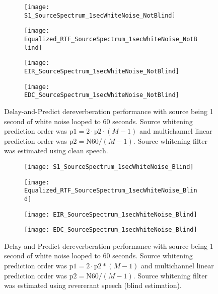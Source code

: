 \begin{figure}[H]
	\centering
	\begin{subfigure}[b]{0.49\textwidth}
		\centering
		\texttt{[image: S1\_SourceSpectrum\_1secWhiteNoise\_NotBlind]}
	\end{subfigure}
	\hfill
	\begin{subfigure}[b]{0.49\textwidth}
		\centering
		\texttt{[image: Equalized\_RTF\_SourceSpectrum\_1secWhiteNoise\_NotBlind]}
	\end{subfigure}
	\hfill
	\begin{subfigure}[b]{0.49\textwidth}
		\centering
		\texttt{[image: EIR\_SourceSpectrum\_1secWhiteNoise\_NotBlind]}
	\end{subfigure}
	\hfill
	\begin{subfigure}[b]{0.49\textwidth}
		\centering
		\texttt{[image: EDC\_SourceSpectrum\_1secWhiteNoise\_NotBlind]}
	\end{subfigure}
	\hfill
	\caption{Delay-and-Predict dereverberation performance with source being 1 second of white noise looped to 60 seconds. Source whitening prediction order was $\mathrm{p1} = 2 \cdot \mathrm{p2} \cdot (M-1)$ and multichannel linear prediction order was $\mathrm{p2} = \mathrm{N60} / (M-1)$. Source whitening filter was estimated using clean speech.}
	\label{fig:params_source_spectrum_1sec_not_blind}
\end{figure}

\begin{figure}[H]
	\centering
	\begin{subfigure}[b]{0.49\textwidth}
		\centering
		\texttt{[image: S1\_SourceSpectrum\_1secWhiteNoise\_Blind]}
	\end{subfigure}
	\hfill
	\begin{subfigure}[b]{0.49\textwidth}
		\centering
		\texttt{[image: Equalized\_RTF\_SourceSpectrum\_1secWhiteNoise\_Blind]}
	\end{subfigure}
	\hfill
	\begin{subfigure}[b]{0.49\textwidth}
		\centering
		\texttt{[image: EIR\_SourceSpectrum\_1secWhiteNoise\_Blind]}
	\end{subfigure}
	\hfill
	\begin{subfigure}[b]{0.49\textwidth}
		\centering
		\texttt{[image: EDC\_SourceSpectrum\_1secWhiteNoise\_Blind]}
	\end{subfigure}
	\hfill
	\caption{Delay-and-Predict dereverberation performance with source being 1 second of white noise looped to 60 seconds. Source whitening prediction order was $\mathrm{p1} = 2 \cdot \mathrm{p2} * (M-1)$ and multichannel linear prediction order was $\mathrm{p2} = \mathrm{N60} / (M-1)$. Source whitening filter was estimated using revererant speech (blind estimation).}
	\label{fig:params_source_spectrum_1sec_blind}
\end{figure}



